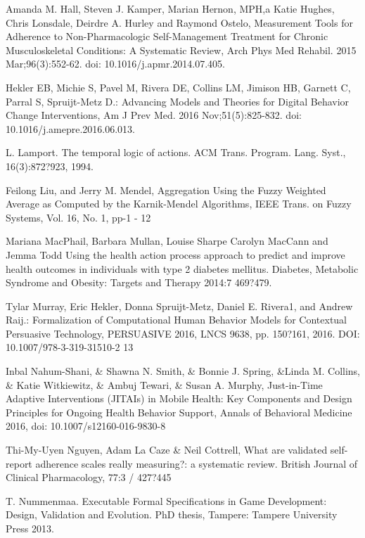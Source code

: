 \documentclass{llncs}
\begin{document}
\begin{thebibliography}{99}
 Amanda M. Hall, Steven J. Kamper, Marian Hernon, MPH,a Katie Hughes,  Chris Lonsdale, Deirdre A. Hurley and Raymond Ostelo, Measurement Tools for Adherence to Non-Pharmacologic Self-Management Treatment for Chronic Musculoskeletal Conditions: A Systematic Review, Arch Phys Med Rehabil. 2015 Mar;96(3):552-62. doi: 10.1016/j.apmr.2014.07.405.

 Hekler EB, Michie S, Pavel M, Rivera DE, Collins LM, Jimison HB, Garnett C, Parral S, Spruijt-Metz D.: Advancing Models and Theories for Digital Behavior Change Interventions, Am J Prev Med. 2016 Nov;51(5):825-832. doi: 10.1016/j.amepre.2016.06.013.

 L. Lamport. The temporal logic of actions. ACM Trans. Program. Lang. Syst., 16(3):872?923, 1994.

 Feilong Liu,  and Jerry M. Mendel, Aggregation Using the Fuzzy Weighted Average as Computed by the Karnik-Mendel Algorithms, IEEE Trans. on Fuzzy Systems, Vol. 16, No. 1, pp-1 - 12 

 Mariana MacPhail, Barbara Mullan, Louise Sharpe Carolyn MacCann and Jemma Todd Using the health action process approach to predict and improve health outcomes in individuals with type 2 diabetes mellitus. Diabetes, Metabolic Syndrome and Obesity: Targets and Therapy 2014:7 469?479.

 Tylar Murray, Eric Hekler, Donna Spruijt-Metz, Daniel E. Rivera1, and Andrew Raij.: Formalization of Computational Human Behavior Models for Contextual Persuasive Technology, PERSUASIVE 2016, LNCS 9638, pp. 150?161, 2016. DOI: 10.1007/978-3-319-31510-2 13

 Inbal Nahum-Shani, \& Shawna N. Smith,  \& Bonnie J. Spring,  \&Linda M. Collins,  \& Katie Witkiewitz,  \& Ambuj Tewari, \& Susan A. Murphy, Just-in-Time Adaptive Interventions (JITAIs) in Mobile Health: Key Components and Design Principles for Ongoing Health Behavior Support, Annals of Behavioral Medicine 2016, doi: 10.1007/s12160-016-9830-8

 Thi-My-Uyen Nguyen, Adam La Caze \& Neil Cottrell, What are validated self-report adherence scales really measuring?: a systematic review. British Journal of Clinical Pharmacology, 77:3 / 427?445

 T. Nummenmaa. Executable Formal Specifications in Game Development: Design, Validation and Evolution. PhD  thesis, Tampere: Tampere University  Press 2013.


\end{thebibliography}
\end{document}
